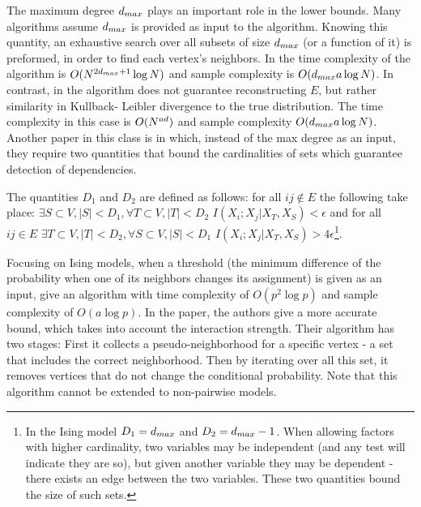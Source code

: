 The maximum degree $d_{max}$ plays an important role in the lower bounds. Many algorithms \cite{bresler2008reconstruction, abbeel2006learning} assume $d_{max}$ is provided as input to the algorithm. Knowing this quantity, an exhaustive search over all subsets of size $d_{max}$ (or a function of it) is preformed, in order to find each vertex's neighbors.  In\cite{bresler2008reconstruction} the time complexity of the algorithm is $O({N}^{2d_{max}+1}\log N)$ and sample complexity is $O(d_{max} a \log N)$. In contrast, in \cite{abbeel2006learning} the algorithm does not guarantee reconstructing $E$, but rather similarity in Kullback- Leibler divergence to the true distribution. The time complexity in this case is $O({N}^{a d})$  and sample complexity $O(d_{max} a \log {N})$. Another paper in this class is \cite{wu2013learning} in which, instead of the max degree as an input, they require two quantities that bound the cardinalities of sets which guarantee detection of dependencies. 

The quantities $D_1$ and $D_2$ are defined as follows: for all $ij \not \in E$ the following take place: $\exists S \subset V, |S|< D_1, \forall T \subset V, |T|<D_2$ $I(X_i;X_j | X_T, X_S)<\epsilon$ and for all $ij \in E$ $\exists T \subset V, |T|< D_2, \forall S \subset V, |S|<D_1$ $I(X_i;X_j | X_T, X_S)>4\epsilon$\footnote{In the Ising model $D_1 = d_{max}$ and $D_2 = d_{max} -1$. When allowing factors with higher cardinality, two variables may be independent (and any test will indicate they are so), but given another variable they may be dependent - there exists an edge between the two variables. These two quantities bound the size of such sets.}. 

Focusing on Ising models, when a threshold (the minimum difference of the probability when one of its neighbors changes its assignment) is given as an input, \cite{bresler2015efficiently} give an algorithm with time complexity of $O(p^2\log p)$ and sample complexity of $O( a \log p)$. In the paper, the authors give a more accurate bound, which takes into account the interaction strength. Their algorithm has two stages: First it collects a pseudo-neighborhood for a specific vertex - a set that includes the correct neighborhood. Then by iterating over all this set, it removes vertices that do not change the conditional probability. Note that this algorithm cannot be extended to non-pairwise models.

